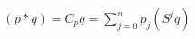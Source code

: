 \documentclass[preview]{standalone}
\begin{document}
\begin{align*}
(p * q) = C_p q = \sum_{j=0}^{n} p_j (S^j q)
\end{align*}
\end{document}
